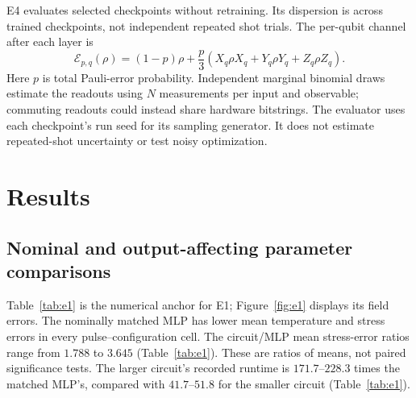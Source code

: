 \documentclass[11pt]{article}
\begin{document}
E4 evaluates selected checkpoints without retraining. Its dispersion is
across trained checkpoints, not independent repeated shot trials. The
per-qubit channel after each layer is
\begin{equation}
 \mathcal E_{p,q}(\rho)=(1-p)\rho+\frac p3
 (X_q\rho X_q+Y_q\rho Y_q+Z_q\rho Z_q).
 \label{eq:channel}
\end{equation}
Here $p$ is total Pauli-error probability. Independent marginal binomial
draws estimate the readouts using $N$ measurements per input and
observable; commuting readouts could instead share hardware bitstrings.
The evaluator uses each checkpoint's run seed for its sampling generator.
It does not estimate repeated-shot uncertainty or test noisy optimization.

\section{Results}

\subsection{Nominal and output-affecting parameter comparisons}

Table~\ref{tab:e1} is the numerical anchor for E1;
Figure~\ref{fig:e1} displays its field errors. The nominally matched MLP
has lower mean temperature and stress errors in every pulse--configuration
cell. The circuit/MLP mean stress-error ratios range from $1.788$ to
$3.645$ (Table~\ref{tab:e1}). These are ratios of means, not paired
significance tests. The larger circuit's recorded runtime is
$171.7$--$228.3$ times the matched MLP's, compared with
$41.7$--$51.8$ for the smaller circuit (Table~\ref{tab:e1}).
\end{document}
